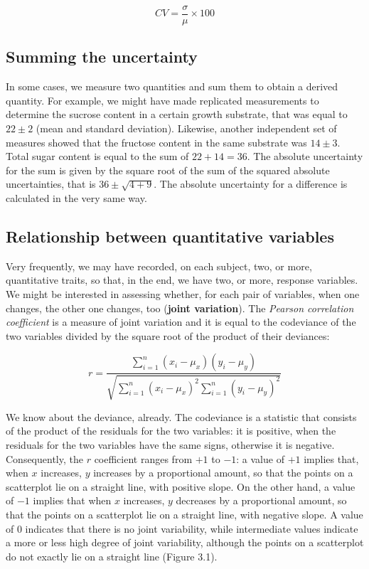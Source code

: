 \documentclass[a4paper,12pt,oneside]{book}
\begin{document}
\[CV = \frac{\sigma }{\mu } \times 100\]

\hypertarget{summing-the-uncertainty}{%
\subsection{Summing the uncertainty}\label{summing-the-uncertainty}}

In some cases, we measure two quantities and sum them to obtain a derived quantity. For example, we might have made replicated measurements to determine the sucrose content in a certain growth substrate, that was equal to \(22 \pm 2\) (mean and standard deviation). Likewise, another independent set of measures showed that the fructose content in the same substrate was \(14 \pm 3\). Total sugar content is equal to the sum of \(22 + 14 = 36\). The absolute uncertainty for the sum is given by the square root of the sum of the squared absolute uncertainties, that is \(36 \pm \sqrt{4 + 9}\). The absolute uncertainty for a difference is calculated in the very same way.

\hypertarget{relationship-between-quantitative-variables}{%
\subsection{Relationship between quantitative variables}\label{relationship-between-quantitative-variables}}

Very frequently, we may have recorded, on each subject, two, or more, quantitative traits, so that, in the end, we have two, or more, response variables. We might be interested in assessing whether, for each pair of variables, when one changes, the other one changes, too (\textbf{joint variation}). The \emph{Pearson correlation coefficient} is a measure of joint variation and it is equal to the codeviance of the two variables divided by the square root of the product of their deviances:

\[r = \frac{ \sum_{i=1}^{n}(x_i - \mu_x)(y_i-\mu_y) }{\sqrt{\sum_{i=1}^{n}(x_i-\mu_x)^2 \sum_{i=1}^{n}(y_i-\mu_y)^2}}\]

We know about the deviance, already. The codeviance is a statistic that consists of the product of the residuals for the two variables: it is positive, when the residuals for the two variables have the same signs, otherwise it is negative. Consequently, the \(r\) coefficient ranges from \(+1\) to \(-1\): a value of \(+1\) implies that, when \(x\) increases, \(y\) increases by a proportional amount, so that the points on a scatterplot lie on a straight line, with positive slope. On the other hand, a value of \(-1\) implies that when \(x\) increases, \(y\) decreases by a proportional amount, so that the points on a scatterplot lie on a straight line, with negative slope. A value of 0 indicates that there is no joint variability, while intermediate values indicate a more or less high degree of joint variability, although the points on a scatterplot do not exactly lie on a straight line (Figure 3.1).
\end{document}
